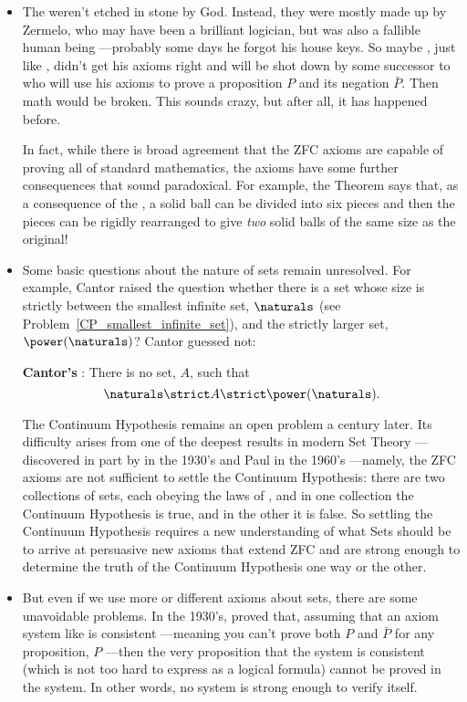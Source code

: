 %
\begin{itemize}

\item The  weren't etched in stone by God.  Instead, they
  were mostly made up by Zermelo, who may have been a brilliant logician,
  but was also a fallible human being ---probably some days he forgot his
  house keys.  So maybe , just like , didn't get
  his axioms right and will be shot down by some successor to
   who will use his axioms to prove a proposition $P$ and its
  negation $\bar{P}$.  Then math would be broken.  This sounds crazy, but
  after all, it has happened before.

  In fact, while there is broad agreement that the ZFC axioms are capable
  of proving all of standard mathematics, the axioms have some further
  consequences that sound paradoxical.  For example, the
   Theorem says that, as a consequence of the
  , a solid ball can be divided into six pieces and
  then the pieces can be rigidly rearranged to give \emph{two} solid balls
  of the same size as the original!

\item Some basic questions about the nature of sets remain unresolved.
  For example, Cantor raised the question whether there is a set whose
  size is strictly between the smallest infinite set, $\naturals$ (see
  Problem~\ref{CP_smallest_infinite_set}), and the strictly larger
  set, $\power(\naturals)$?  Cantor guessed not:

  \textbf{Cantor's }: There is no set, $A$,
  such that
  \[
  \naturals \strict A \strict \power(\naturals).
  \]

  The Continuum Hypothesis remains an open problem a century later.
  Its difficulty arises from one of the deepest results in modern Set
  Theory ---discovered in part by  in the 1930's and Paul
   in the 1960's ---namely, the ZFC axioms are not
  sufficient to settle the Continuum Hypothesis: there are two
  collections of sets, each obeying the laws of , and in one
  collection the Continuum Hypothesis is true, and in the other it is
  false.  So settling the Continuum Hypothesis requires a new
  understanding of what Sets should be to arrive at persuasive new
  axioms that extend ZFC and are strong enough to determine the truth
  of the Continuum Hypothesis one way or the other.

\item But even if we use more or different axioms about sets, there
  are some unavoidable problems.  In the 1930's,  proved
  that, assuming that an axiom system like  is
  consistent ---meaning you can't prove both $P$ and $\bar{P}$ for any
  proposition, $P$ ---then the very proposition that the system is
  consistent (which is not too hard to express as a logical formula)
  cannot be proved in the system.  In other words, no 
  system is strong enough to verify itself.
  
\end{itemize}

